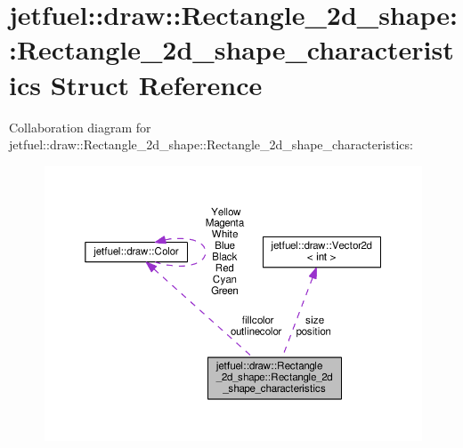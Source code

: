 \hypertarget{structjetfuel_1_1draw_1_1Rectangle__2d__shape_1_1Rectangle__2d__shape__characteristics}{}\section{jetfuel\+:\+:draw\+:\+:Rectangle\+\_\+2d\+\_\+shape\+:\+:Rectangle\+\_\+2d\+\_\+shape\+\_\+characteristics Struct Reference}
\label{structjetfuel_1_1draw_1_1Rectangle__2d__shape_1_1Rectangle__2d__shape__characteristics}


Collaboration diagram for jetfuel\+:\+:draw\+:\+:Rectangle\+\_\+2d\+\_\+shape\+:\+:Rectangle\+\_\+2d\+\_\+shape\+\_\+characteristics\+:
\nopagebreak
\begin{figure}[H]
\begin{center}
\leavevmode
\includegraphics[width=350pt]{structjetfuel_1_1draw_1_1Rectangle__2d__shape_1_1Rectangle__2d__shape__characteristics__coll__graph}
\end{center}
\end{figure}
